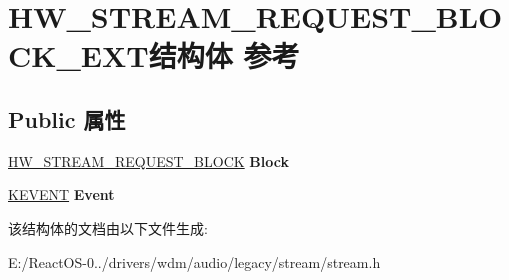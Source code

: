 \hypertarget{struct_h_w___s_t_r_e_a_m___r_e_q_u_e_s_t___b_l_o_c_k___e_x_t}{}\section{H\+W\+\_\+\+S\+T\+R\+E\+A\+M\+\_\+\+R\+E\+Q\+U\+E\+S\+T\+\_\+\+B\+L\+O\+C\+K\+\_\+\+E\+X\+T结构体 参考}
\label{struct_h_w___s_t_r_e_a_m___r_e_q_u_e_s_t___b_l_o_c_k___e_x_t}
\subsection*{Public 属性}
\begin{DoxyCompactItemize}
\item 
\mbox{\label{struct_h_w___s_t_r_e_a_m___r_e_q_u_e_s_t___b_l_o_c_k___e_x_t_a4fb3b0f6633c88bc780fcaaba4bc5fc5}} 
\hyperlink{struct___h_w___s_t_r_e_a_m___r_e_q_u_e_s_t___b_l_o_c_k}{H\+W\+\_\+\+S\+T\+R\+E\+A\+M\+\_\+\+R\+E\+Q\+U\+E\+S\+T\+\_\+\+B\+L\+O\+CK} {\bfseries Block}
\item 
\mbox{\label{struct_h_w___s_t_r_e_a_m___r_e_q_u_e_s_t___b_l_o_c_k___e_x_t_a1c80210d468639640ff19284759b5765}} 
\hyperlink{struct___k_e_v_e_n_t}{K\+E\+V\+E\+NT} {\bfseries Event}
\end{DoxyCompactItemize}


该结构体的文档由以下文件生成\+:\begin{DoxyCompactItemize}
\item 
E\+:/\+React\+O\+S-\/0../drivers/wdm/audio/legacy/stream/stream.\+h\end{DoxyCompactItemize}
